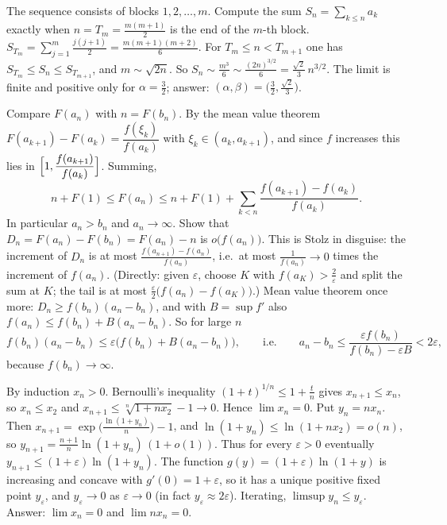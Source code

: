 \documentclass[11pt,a4paper]{article}
\begin{document}

 The sequence consists of blocks $1,2,\dots,m$. Compute the sum $S_n=\sum_{k\le n}a_k$ exactly when $n=T_m=\frac{m(m+1)}2$ is the end of the $m$-th block.
 $S_{T_m}=\sum_{j=1}^m\frac{j(j+1)}2=\frac{m(m+1)(m+2)}6$. For $T_m\le n<T_{m+1}$ one has $S_{T_m}\le S_n\le S_{T_{m+1}}$, and $m\sim\sqrt{2n}$.
 So $S_n\sim\frac{m^3}6\sim\frac{(2n)^{3/2}}6=\frac{\sqrt2}3\,n^{3/2}$. The limit is finite and positive only for $\alpha=\frac32$; answer: $(\alpha,\beta)=\bigl(\frac32,\frac{\sqrt2}3\bigr)$.

 Compare $F(a_n)$ with $n=F(b_n)$. By the mean value theorem $F(a_{k+1})-F(a_k)=\dfrac{f(\xi_k)}{f(a_k)}$ with $\xi_k\in(a_k,a_{k+1})$, and since $f$ increases this lies in $\Bigl[1,\dfrac{f(a_{k+1})}{f(a_k)}\Bigr]$. Summing,
\[n+F(1)\le F(a_n)\le n+F(1)+\sum_{k<n}\frac{f(a_{k+1})-f(a_k)}{f(a_k)}.\]
In particular $a_n>b_n$ and $a_n\to\infty$.
 Show that $D_n=F(a_n)-F(b_n)=F(a_n)-n$ is $o\bigl(f(a_n)\bigr)$. This is Stolz in disguise: the increment of $D_n$ is at most $\frac{f(a_{n+1})-f(a_n)}{f(a_n)}$, i.e.\ at most $\frac1{f(a_n)}\to0$ times the increment of $f(a_n)$. (Directly: given $\varepsilon$, choose $K$ with $f(a_K)>\frac2\varepsilon$ and split the sum at $K$; the tail is at most $\frac\varepsilon2\bigl(f(a_n)-f(a_K)\bigr)$.)
 Mean value theorem once more: $D_n\ge f(b_n)(a_n-b_n)$, and with $B=\sup f'$ also $f(a_n)\le f(b_n)+B(a_n-b_n)$. So for large $n$
\[f(b_n)(a_n-b_n)\le\varepsilon\bigl(f(b_n)+B(a_n-b_n)\bigr),\qquad\text{i.e.}\qquad a_n-b_n\le\frac{\varepsilon f(b_n)}{f(b_n)-\varepsilon B}<2\varepsilon,\]
because $f(b_n)\to\infty$.

 By induction $x_n>0$. Bernoulli's inequality $(1+t)^{1/n}\le1+\frac tn$ gives $x_{n+1}\le x_n$, so $x_n\le x_2$ and $x_{n+1}\le\sqrt[n]{1+nx_2}-1\to0$. Hence $\lim x_n=0$.
 Put $y_n=nx_n$. Then $x_{n+1}=\exp\bigl(\frac{\ln(1+y_n)}n\bigr)-1$, and $\ln(1+y_n)\le\ln(1+nx_2)=o(n)$, so $y_{n+1}=\frac{n+1}n\ln(1+y_n)\,(1+o(1))$. Thus for every $\varepsilon>0$ eventually $y_{n+1}\le(1+\varepsilon)\ln(1+y_n)$.
 The function $g(y)=(1+\varepsilon)\ln(1+y)$ is increasing and concave with $g'(0)=1+\varepsilon$, so it has a unique positive fixed point $y_\varepsilon$, and $y_\varepsilon\to0$ as $\varepsilon\to0$ (in fact $y_\varepsilon\approx2\varepsilon$). Iterating, $\limsup y_n\le y_\varepsilon$. Answer: $\lim x_n=0$ and $\lim nx_n=0$.
\end{document}
